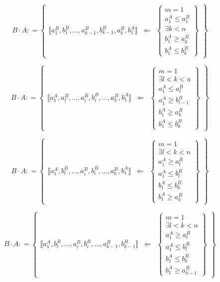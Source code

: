 \begin{enumerate}
  \[{{B \cdot A}{: =}}\begin{Bmatrix}
  {⟦{{a_{1}^{B},b_{1}^{B}},\ldots,{a_{k - 1}^{B},b_{k - 1}^{B}},{a_{k}^{B},b_{1}^{A}}}⟧} & \Leftarrow & \begin{Bmatrix}
  {m = 1} \\
  {a_{1}^{A} \leq a_{1}^{B}} \\
  {\exists{k < n}} \\
  {b_{1}^{A} \geq a_{k}^{B}} \\
  {b_{1}^{A} \leq b_{k}^{B}}
  \end{Bmatrix}
  \end{Bmatrix}\]

  \[{{B \cdot A}{: =}}\begin{Bmatrix}
  {⟦{{a_{1}^{A},a_{l}^{B}},\ldots,{a_{i}^{B},b_{i}^{B}},\ldots,{a_{k}^{B},b_{1}^{A}}}⟧} & \Leftarrow & \begin{Bmatrix}
  {m = 1} \\
  {\exists{{l < k} < n}} \\
  {a_{1}^{A} \leq a_{l}^{B}} \\
  {a_{1}^{A} \geq b_{l - 1}^{B}} \\
  {b_{1}^{A} \geq a_{k}^{B}} \\
  {b_{1}^{A} \leq b_{k}^{B}}
  \end{Bmatrix}
  \end{Bmatrix}\]

  \[{{B \cdot A}{: =}}\begin{Bmatrix}
  {⟦{{a_{1}^{A},b_{l}^{B}},\ldots,{a_{i}^{B},b_{i}^{B}},\ldots,{a_{k}^{B},b_{1}^{A}}}⟧} & \Leftarrow & \begin{Bmatrix}
  {m = 1} \\
  {\exists{{l < k} < n}} \\
  {a_{1}^{A} \geq a_{l}^{B}} \\
  {a_{1}^{A} \leq b_{l}^{B}} \\
  {b_{1}^{A} \leq b_{k}^{B}} \\
  {b_{1}^{A} \geq a_{k}^{B}}
  \end{Bmatrix}
  \end{Bmatrix}\]

  \[{{B \cdot A}{: =}}\begin{Bmatrix}
  {⟦{{a_{1}^{A},b_{l}^{B}},\ldots,{a_{i}^{B},b_{i}^{B}},\ldots,{a_{k - 1}^{B},b_{k - 1}^{B}}}⟧} & \Leftarrow & \begin{Bmatrix}
  {m = 1} \\
  {\exists{{l < k} < n}} \\
  {a_{1}^{A} \geq a_{l}^{B}} \\
  {a_{1}^{A} \leq b_{l}^{B}} \\
  {b_{1}^{A} \leq b_{k}^{B}} \\
  {b_{1}^{A} \geq a_{k - 1}^{B}}
  \end{Bmatrix}
  \end{Bmatrix}\]


\end{enumerate}
